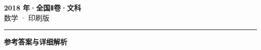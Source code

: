 \documentclass[zihao=5, a4paper]{ctexart}
\begin{document}
\begin{center}
  {\Large\bfseries 2018 年·全国Ⅱ卷·文科}\\[4pt]
  {\large 数学 · 印刷版}
\end{center}
\medskip
{}

\par\bigskip\hrule\bigskip
{}
\begin{center}{\large\bfseries 参考答案与详细解析}\end{center}
\smallskip

\end{document}
